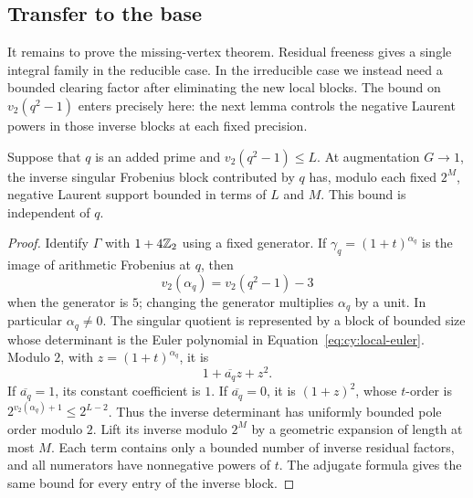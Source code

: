 \subsection{Transfer to the base}

It remains to prove the missing-vertex theorem. Residual freeness gives
a single integral family in the reducible case. In the irreducible
case we instead need a bounded clearing factor after eliminating the
new local blocks. The bound on $v_2(q^2-1)$ enters precisely here: the
next lemma controls the negative Laurent powers in those inverse
blocks at each fixed precision.

\begin{lemma}\label{lem:cy:cyclotomic-poles}
Suppose that $q$ is an added prime and $v_2(q^2-1)\le L$.  At
augmentation $G\to1$, the inverse singular Frobenius block contributed
by $q$ has, modulo each fixed $2^M$, negative Laurent support bounded
in terms of $L$ and $M$.  This bound is independent of $q$.
\end{lemma}

\begin{proof}
Identify $\Gamma$ with $1+4\mathbb Z_2$ using a fixed generator.  If
$\gamma_q=(1+t)^{\alpha_q}$ is the image of arithmetic Frobenius at
$q$, then
\[
 v_2(\alpha_q)=v_2(q^2-1)-3
\]
when the generator is $5$; changing the generator multiplies
$\alpha_q$ by a unit.  In particular $\alpha_q\ne0$.  The singular
quotient is represented by a block of bounded size whose determinant
is the Euler polynomial in Equation~\eqref{eq:cy:local-euler}.
Modulo $2$, with $z=(1+t)^{\alpha_q}$, it is
\[
 1+\overline{a_q}z+z^2.
\]
If $\overline{a_q}=1$, its constant coefficient is $1$.  If
$\overline{a_q}=0$, it is $(1+z)^2$, whose $t$-order is
$2^{v_2(\alpha_q)+1}\le2^{L-2}$.  Thus the inverse determinant has
uniformly bounded pole order modulo $2$.  Lift its inverse modulo
$2^M$ by a geometric expansion of length at most $M$.  Each term
contains only a bounded number of inverse residual factors, and all
numerators have nonnegative powers of $t$.  The adjugate formula gives
the same bound for every entry of the inverse block.
\end{proof}

